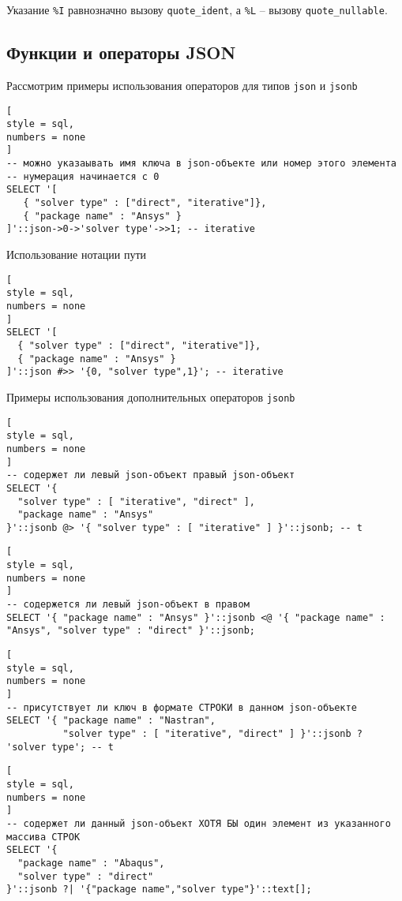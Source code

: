 \documentclass[%
	11pt,
	a4paper,
	utf8,
		]{article}
\begin{document}
Указание \verb|%I| равнозначно вызову \texttt{quote\_ident}, а \verb|%L| -- вызову \texttt{quote\_nullable}. 

\subsection{Функции и операторы JSON}

Рассмотрим примеры использования операторов для типов \texttt{json} и \texttt{jsonb}
\begin{lstlisting}[
style = sql, 
numbers = none
]
-- можно указаывать имя ключа в json-объекте или номер этого элемента
-- нумерация начинается с 0
SELECT '[
   { "solver type" : ["direct", "iterative"]},
   { "package name" : "Ansys" }
]'::json->0->'solver type'->>1; -- iterative
\end{lstlisting}

Использование нотации пути
\begin{lstlisting}[
style = sql, 
numbers = none
]
SELECT '[
  { "solver type" : ["direct", "iterative"]},
  { "package name" : "Ansys" }
]'::json #>> '{0, "solver type",1}'; -- iterative
\end{lstlisting}

Примеры использования дополнительных операторов \texttt{jsonb}
\begin{lstlisting}[
style = sql, 
numbers = none
]
-- содержет ли левый json-объект правый json-объект
SELECT '{
  "solver type" : [ "iterative", "direct" ],
  "package name" : "Ansys"
}'::jsonb @> '{ "solver type" : [ "iterative" ] }'::jsonb; -- t
\end{lstlisting}

\begin{lstlisting}[
style = sql, 
numbers = none
]
-- содержется ли левый json-объект в правом
SELECT '{ "package name" : "Ansys" }'::jsonb <@ '{ "package name" : "Ansys", "solver type" : "direct" }'::jsonb;
\end{lstlisting}

\begin{lstlisting}[
style = sql, 
numbers = none
]
-- присутствует ли ключ в формате СТРОКИ в данном json-объекте
SELECT '{ "package name" : "Nastran",
          "solver type" : [ "iterative", "direct" ] }'::jsonb ? 'solver type'; -- t
\end{lstlisting}

\begin{lstlisting}[
style = sql, 
numbers = none
]
-- содержет ли данный json-объект ХОТЯ БЫ один элемент из указанного массива СТРОК
SELECT '{
  "package name" : "Abaqus",
  "solver type" : "direct"
}'::jsonb ?| '{"package name","solver type"}'::text[];
\end{lstlisting}
\end{document}
